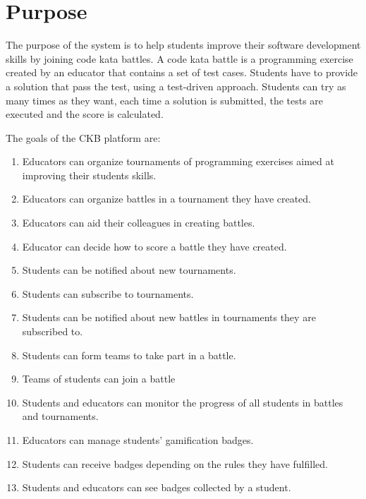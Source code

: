 \section{Purpose}
The purpose of the system is to help students improve their software development skills by joining code kata battles.
A code kata battle is a programming exercise created by an educator that contains a set of test cases.
Students have to provide a solution that pass the test, using a test-driven approach.
Students can try as many times as they want, each time a solution is submitted, the tests are executed and the score is calculated.

The goals of the CKB platform are:
\begin{enumerate}[label=\textbf{G\arabic*}:,leftmargin=1.3cm]
    \item Educators can organize tournaments of programming exercises aimed at improving their students skills.
    \item Educators can organize battles in a tournament they have created.
    \item Educators can aid their colleagues in creating battles.
    \item Educator can decide how to score a battle they have created.
    \item Students can be notified about new tournaments.
    \item Students can subscribe to tournaments.
    \item Students can be notified about new battles in tournaments they are subscribed to.
    \item Students can form teams to take part in a battle.
    \item Teams of students can join a battle
    \item Students and educators can monitor the progress of all students in battles and tournaments.
    \item Educators can manage students’ gamification badges.
    \item Students can receive badges depending on the rules they have fulfilled.
    \item Students and educators can see badges collected by a student.
\end{enumerate}

